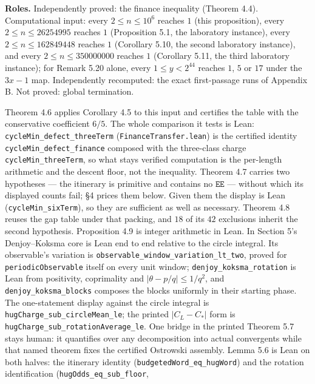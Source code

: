 \documentclass[12pt]{article}
\begin{document}
\textbf{Roles.} Independently proved: the finance inequality (Theorem
4.4). Computational input: every \(2\le n\le 10^6\) reaches \(1\) (this
proposition), every \(2\le n\le 26254995\) reaches \(1\) (Proposition
5.1, the laboratory instance), every \(2\le n\le 162849448\) reaches
\(1\) (Corollary 5.10, the second laboratory instance), and every
\(2\le n\le 350000000\) reaches \(1\) (Corollary 5.11, the third
laboratory instance); for Remark 5.20 alone, every \(1\le y<2^{44}\)
reaches \(1\), \(5\) or \(17\) under the \(3x-1\) map. Independently
recomputed: the exact first-passage runs of Appendix B. Not proved:
global termination.

Theorem 4.6 applies Corollary 4.5 to this input and certifies the table
with the conservative coefficient \(6/5\). The whole comparison it tests
is Lean: \texttt{\nolinkurl{cycleMin_defect_threeTerm}}
(\texttt{\nolinkurl{FinanceTransfer.lean}}) is the certified identity
\texttt{\nolinkurl{cycleMin_defect_finance}} composed with the
three-class charge \texttt{\nolinkurl{cycleMin_threeTerm}}, so what
stays verified computation is the per-length arithmetic and the descent
floor, not the inequality. Theorem 4.7 carries two hypotheses --- the
itinerary is primitive and contains no \(\mathtt{EE}\) --- without which
its displayed counts fail; §4 prices them below. Given them the display
is Lean (\texttt{\nolinkurl{cycleMin_sixTerm}}), so they are sufficient
as well as necessary. Theorem 4.8 reuses the gap table under that
packing, and \(18\) of its \(42\) exclusions inherit the second
hypothesis. Proposition 4.9 is integer arithmetic in Lean. In Section
5's Denjoy--Koksma core is Lean end to end relative to the circle
integral. Its observable's variation is
\texttt{\nolinkurl{observable_window_variation_lt_two}}, proved for
\texttt{\nolinkurl{periodicObservable}} itself on every unit window;
\texttt{\nolinkurl{denjoy_koksma_rotation}} is Lean from positivity,
coprimality and \(|\theta-p/q|\le1/q^2\), and
\texttt{\nolinkurl{denjoy_koksma_blocks}} composes the blocks uniformly
in their starting phase. The one-statement display against the circle
integral is \texttt{\nolinkurl{hugCharge_sub_circleMean_le}}; the
printed \(|C_L-C_*|\) form is
\texttt{\nolinkurl{hugCharge_sub_rotationAverage_le}}. One bridge in the
printed Theorem 5.7 stays human: it quantifies over any decomposition
into actual convergents while that named theorem fixes the certified
Ostrowski assembly. Lemma 5.6 is Lean on both halves: the itinerary
identity (\texttt{\nolinkurl{budgetedWord_eq_hugWord}}) and the rotation
identification (\texttt{\nolinkurl{hugOdds_eq_sub_floor}},
\end{document}
